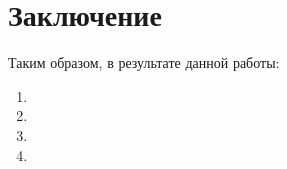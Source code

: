 \chapter*{Заключение}						%

Таким образом, в результате данной работы:
\begin{enumerate}
  \item 
  \item 
  \item 
  \item
\end{enumerate}


\clearpage